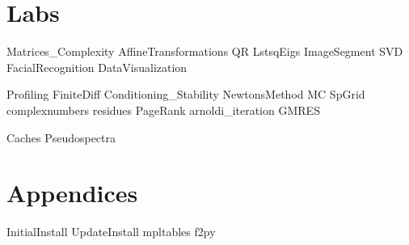 \documentclass[nociteref]{SIAM-GH-book}
\begin{document}
\part{Labs}
{Matrices_Complexity}
{AffineTransformations}
{QR}
{LstsqEigs}
{ImageSegment}
{SVD}
{FacialRecognition}
{DataVisualization}

{Profiling}
{FiniteDiff}
{Conditioning_Stability}
{NewtonsMethod}
{MC}
{SpGrid}
{complexnumbers}
{residues}
{PageRank}
{arnoldi_iteration}
{GMRES}



{Caches}
{Pseudospectra}


\part{Appendices}
\begin{appendices}
{InitialInstall}
{UpdateInstall}
{mpltables}
{f2py}
\end{appendices}
\end{document}

